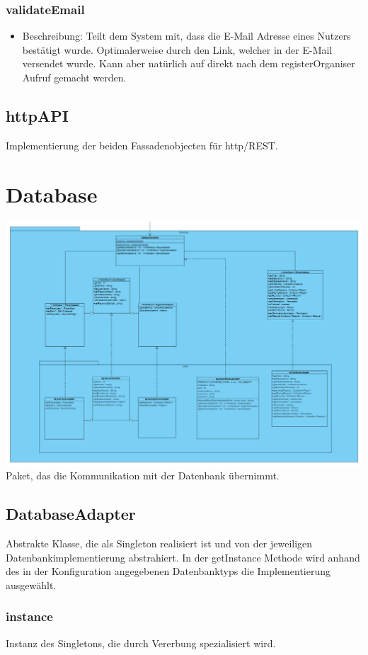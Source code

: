 \documentclass[a4paper]{scrreprt}
\begin{document}
	\subsubsection{validateEmail}
	\begin{itemize}
		\item Beschreibung: Teilt dem System mit, dass die E-Mail Adresse eines Nutzers bestätigt wurde. Optimalerweise durch den Link, welcher in der E-Mail versendet wurde. Kann aber natürlich auf direkt nach dem registerOrganiser Aufruf gemacht werden.
	\end{itemize}
	\subsection{httpAPI}
	Implementierung der beiden Fassadenobjecten für http/REST.

	\section{Database}
	\includegraphics[width=\textwidth]{img/Database.PNG}
	Paket, das die Kommunikation mit der Datenbank übernimmt.

	\subsection{DatabaseAdapter}
	Abstrakte Klasse, die als Singleton realisiert ist und von der jeweiligen Datenbankimplementierung abstrahiert.
	In der getInstance Methode wird anhand des in der Konfiguration angegebenen Datenbanktyps die Implementierung ausgewählt.

	\subsubsection{instance}
	Instanz des Singletons, die durch Vererbung spezialisiert wird.
\end{document}
